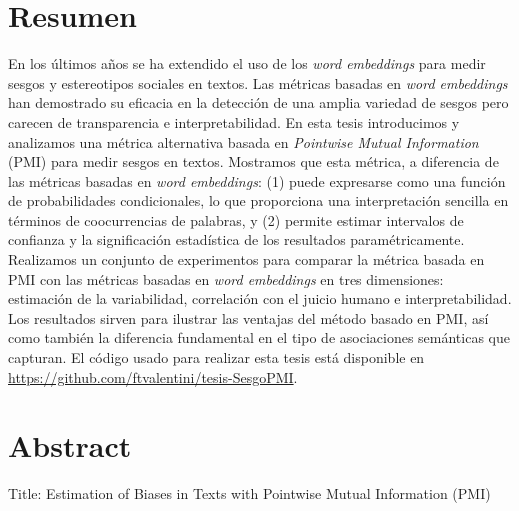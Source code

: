 
\chapter*{Resumen}

En los últimos años se ha extendido el uso de los \emph{word embeddings} para medir sesgos y estereotipos sociales en textos. Las métricas basadas en \emph{word embeddings} han demostrado su eficacia en la detección de una amplia variedad de sesgos pero carecen de transparencia e interpretabilidad. En esta tesis introducimos y analizamos una métrica alternativa basada en \emph{Pointwise Mutual Information} (PMI) para medir sesgos en textos. Mostramos que esta métrica, a diferencia de las métricas basadas en \emph{word embeddings}: (1) puede expresarse como una función de probabilidades condicionales, lo que proporciona una interpretación sencilla en términos de coocurrencias de palabras, y (2) permite estimar intervalos de confianza y la significación estadística de los resultados paramétricamente. Realizamos un conjunto de experimentos para comparar la métrica basada en PMI con las métricas basadas en \emph{word embeddings} en tres dimensiones: estimación de la variabilidad, correlación con el juicio humano e interpretabilidad. Los resultados sirven para ilustrar las ventajas del método basado en PMI, así como también la diferencia fundamental en el tipo de asociaciones semánticas que capturan. El código usado para realizar esta tesis está disponible en \url{https://github.com/ftvalentini/tesis-SesgoPMI}.


\vspace{1cm}

{\let\clearpage\relax\chapter*{Abstract}}

Title: Estimation of Biases in Texts with Pointwise Mutual Information (PMI)

